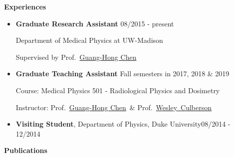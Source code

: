 \documentclass[letterpaper,11pt]{article}
\newcommand{\resheading}[1]{{\large \colorbox{mygrey}{\begin{minipage}{\textwidth}{\textbf{#1 \vphantom{p\^{E}}}}\end{minipage}}}}
\newcommand{\profchen}{Prof.~\href{https://www.medphysics.wisc.edu/blog/staff/chen-guanghong/} {Guang-Hong Chen}}
\newcommand{\profculberson}{Prof.~\href{https://www.medphysics.wisc.edu/blog/staff/culberson-wesley/} {Wesley~Culberson}}
\begin{document}
\resheading{Experiences}
\begin{itemize}
\item \textbf{Graduate Research Assistant}\cftdotfill{\cftdotsep} 08/2015 - present

Department of Medical Physics at UW-Madison

Supervised by \profchen
\item \textbf{Graduate Teaching Assistant} \cftdotfill{\cftdotsep} Fall semesters in 2017,  2018 \& 2019

Course: Medical Physics 501 - Radiological Physics and Dosimetry

Instructor: \profchen~\& \profculberson
	 \item \textbf{Visiting Student}, Department of Physics, Duke University\cftdotfill{\cftdotsep}08/2014 - 12/2014
\end{itemize}
\resheading{Publications}
\end{document}

